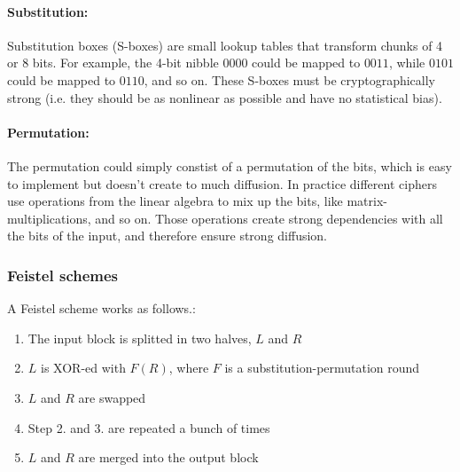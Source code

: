 \documentclass{article}
\begin{document}
  \paragraph{Substitution:}
  
  Substitution boxes (S-boxes) 
  are small lookup tables that transform chunks of
  4 or 8 bits. For example, the 4-bit nibble $0000$ could be mapped to
  $0011$, while $0101$ could be mapped to $0110$, and so on.
  These S-boxes must be cryptographically strong (i.e. they
  should be as nonlinear as possible and have no statistical bias).

  \paragraph{Permutation:}
  The permutation could simply constist of a permutation of the bits,
  which is easy to implement but doesn't create to much diffusion.
  In practice different ciphers use operations from the linear algebra 
  to mix up the bits, like matrix-multiplications, and so on.
  Those operations create strong dependencies with all the bits of the
  input, and therefore ensure strong diffusion.

  \subsubsection{Feistel schemes}

  A Feistel scheme works as follows.:  
  \begin{enumerate}
	\item The input block is splitted in two halves, $L$ and $R$
	\item $L$ is XOR-ed with $F(R)$, where $F$ is a
	  substitution-permutation round
	\item $L$ and $R$ are swapped
	\item Step 2. and 3. are repeated a bunch of times
	\item $L$ and $R$ are merged into the output block
  \end{enumerate}

  \begin{center}
  \end{center}
\end{document}
